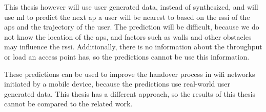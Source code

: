 This thesis however will use user generated data, instead of synthesized, and will use \ac{ml} to predict the next \ac{ap} a user will be nearest to based on the \ac{rssi} of the \acp{ap} and the trajectory of the user.
The prediction will be difficult, because we do not know the location of the \acp{ap}, and factors such as walls and other obstacles may influence the \ac{rssi}.
Additionally, there is no information about the throughput or load an access point has, so the predictions cannot be use this information.

These predictions can be used to improve the handover process in \ac{wifi} networks initiated by a mobile device, because the predictions use real-world user generated data.
This thesis has a different approach, so the results of this thesis cannot be compared to the related work.

